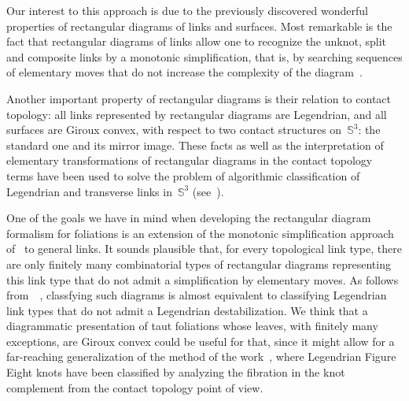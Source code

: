 \documentclass{amsart}
\theoremstyle{theorem}
\theoremstyle{remark}
\theoremstyle{definition}
\numberwithin{equation}{section}
\numberwithin{figure}{section}
\begin{document}
Our interest to this approach is due to the previously discovered wonderful properties
of rectangular diagrams of links and surfaces. Most remarkable is the fact
that rectangular diagrams of links allow one to recognize the unknot, split and composite links
by a monotonic simplification, that is, by searching sequences
of elementary moves that do not increase the complexity of the diagram~\cite{dynn06}.

Another important property of rectangular diagrams is their relation to contact topology:
all links represented by rectangular diagrams are Legendrian, and all surfaces are Giroux convex,
with respect to two contact structures on~$\mathbb S^3$: the standard  one and its mirror image.
These facts as well as the interpretation of elementary
transformations of rectangular diagrams in the contact topology terms have been used to solve the problem
of algorithmic classification of Legendrian and transverse links in~$\mathbb S^3$
(see~\cite{dynpras25,dynshast}).

One of the goals we have in mind when developing the rectangular diagram formalism
for foliations is an extension of the monotonic simplification approach of~\cite{dynn06}
to general links. It sounds plausible that, for every topological link type,
there are only finitely many combinatorial types of rectangular diagrams
representing this link type that do not admit a simplification by elementary moves.
As follows from~~\cite{dynpras25,dynshast}, classfying such diagrams is almost equivalent to classifying Legendrian link types
that do not admit a Legendrian destabilization. We think that a diagrammatic
presentation of taut foliations whose leaves, with finitely many exceptions, are Giroux
convex could be useful for that, since it might allow for a far-reaching generalization
of the method of the work~\cite{etnyrehonda}, where Legendrian Figure Eight knots
have been classified by analyzing the fibration in the knot complement
from the contact topology point of view.
\end{document}
